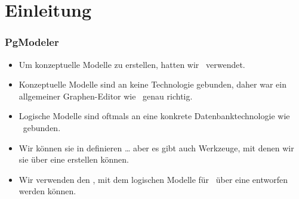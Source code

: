 \documentclass[aspectratio=169,mathserif,notheorems]{beamer}%
\subtitle{35.~PgModeler Installieren}%
\begin{document}
%
%
\startPresentation%
%
\section{Einleitung}%
%
\begin{frame}%
\frametitle{PgModeler}%
\bigskip\strut\bigskip%
\begin{itemize}%
\item Um konzeptuelle Modelle zu erstellen, hatten wir \yEd\ verwendet.%
\item<2-> Konzeptuelle Modelle sind an keine Technologie gebunden, daher war ein allgemeiner Graphen-Editor wie \yEd\ genau richtig.%
\item<3-> Logische Modelle sind oftmals an eine konkrete Datenbanktechnologie wie \postgresql\ gebunden.%
\item<4-> Wir können sie in  definieren {\dots} aber es gibt auch Werkzeuge, mit denen wir sie über eine  erstellen können.%
\item<5-> Wir verwenden den \pgmodeler\cite{AES2006PPDM}, mit dem logischen Modelle für \postgresql\ über eine  entworfen werden können.%
\end{itemize}%
%
\end{frame}%
%
\end{document}
